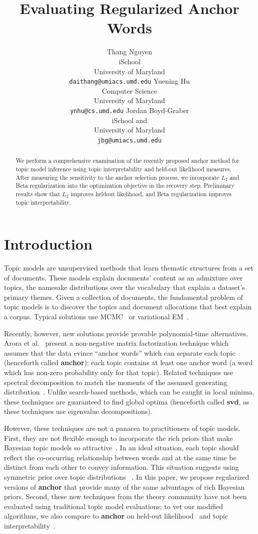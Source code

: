 \documentclass{article}
\title{Evaluating Regularized Anchor Words}
\author{
Thang Nguyen\\
iSchool\\
University of Maryland\\
\texttt{daithang@umiacs.umd.edu}
\And
Yuening Hu\\
Computer Science\\
University of Maryland\\
\texttt{ynhu@cs.umd.edu}
\And
Jordan Boyd-Graber \\
iSchool and \abr{umiacs} \\
University of Maryland \\
\texttt{jbg@umiacs.umd.edu}
}
\providecommand{\citep}[1]{\cite{#1}}
\begin{document}
\maketitle

\begin{abstract}
We perform a comprehensive examination of the recently proposed anchor method
for topic model inference using topic interpretability and held-out likelihood
measures.  After measuring the sensitivity to the anchor selection process, we
incorporate $L_2$ and Beta regularization into the optimization objective in the
recovery step.  Preliminary results show that $L_2$ improves heldout likelihood,
and Beta regularization improves topic interpretability.
\end{abstract}

\section{Introduction}
\label{sec:intro}

Topic models are unsupervised methods that learn thematic structures from a set
of documents. These models explain documents' content as an admixture over topics, 
the namesake distributions over the vocabulary that explain a dataset's primary themes.
Given a collection of documents, the fundamental problem of topic models is to
discover the topics and document allocations that best explain a corpus. Typical
solutions use MCMC~\cite{griffiths-04} or variational EM~\cite{blei-03}.

Recently, however, new solutions provide provable polynomial-time
alternatives. Arora et al.~\cite{Arora-2012b} present a non-negative matrix factorization
technique which assumes that the data evince ``anchor words'' which can separate
each topic (henceforth called {\bf anchor}); each topic contains at least one
anchor word (a word which has non-zero probability only for that topic). Related
techniques use spectral decomposition to match the moments of the assumed
generating distribution~\citep{Anandkumar-2012c}.  Unlike search-based methods,
which can be caught in local minima, these techniques are guaranteed to find
global optima (henceforth called {\bf svd}, as these techniques use eigenvalue
decompositions).

However, these techniques are not a panacea to practitioners of topic models.
First, they are not flexible enough to incorporate the rich priors that make
Bayesian topic models so attractive~\citep{wallach-09b}. In an ideal situation, each topic should reflect the co-occurring relationship between words and at the same time be distinct from each other to convey information. This situation suggests using symmetric prior over topic distributions ~\citep{wallach-09b}.  In this paper, we
propose regularized versions of {\bf anchor} that provide many of the same
advantages of rich Bayesian priors. Second, these new techniques from the
theory community have not been evaluated using traditional topic model
evaluations; to vet our modified algorithms, we also compare to {\bf anchor} 
on held-out
likelihood~\citep{blei-03} and topic
interpretability~\citep{chang-09b,newman-10}.
\end{document}
